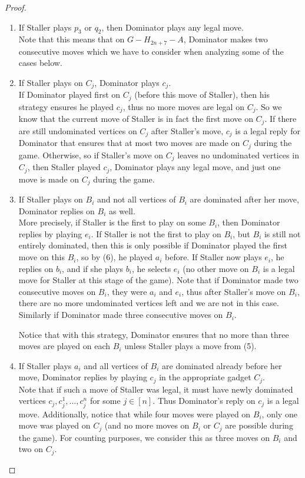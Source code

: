 \documentclass[12pt]{article}
\begin{document}
\begin{proof}
\begin{enumerate}[(1)]
		\item If Staller plays $p_3$ or $q_2$, then Dominator plays any legal move.\\
		Note that this means that on $G - H_{2n+7} -A$, Dominator makes two consecutive moves which we have to consider when analyzing some of the cases below.
		
		\item If Staller plays on $C_j$, Dominator plays $c_j$.\\
		If Dominator played first on $C_j$ (before this move of Staller), then his strategy ensures he played $c_j$, thus no more moves are legal on $C_j$. So we know that the current move of Staller is in fact the first move on $C_j$. If there are still undominated vertices on $C_j$ after Staller's move, $c_j$ is a legal reply for Dominator that ensures that at most two moves are made on $C_j$ during the game. Otherwise, so if Staller's move on $C_j$ leaves no undominated vertices in $C_j$, then Staller played $c_j$, Dominator plays any legal move, and just one move is made on $C_j$ during the game.
		
		\item If Staller plays on $B_i$ and not all vertices of $B_i$ are dominated after her move, Dominator replies on $B_i$ as well.\\
		More precisely, if Staller is the first to play on some $B_i$, then Dominator replies by playing $e_i$. If Staller is not the first to play on $B_i$, but $B_i$ is still not entirely dominated, then this is only possible if Dominator played the first move on this $B_i$, so by (6), he played $a_i$ before. If Staller now plays $e_i$, he replies on $b_i$, and if she plays $b_i$, he selects $e_i$ (no other move on $B_i$ is a legal move for Staller at this stage of the game). Note that if Dominator made two consecutive moves on $B_i$, they were $a_i$ and $e_i$, thus after Staller's move on $B_i$, there are no more undominated vertices left and we are not in this case. Similarly if Dominator made three consecutive moves on $B_i$.
		
		Notice that with this strategy, Dominator ensures that no more than three moves are played on each $B_i$ unless Staller plays a move from (5).
		
		\item If Staller plays $a_i$ and all vertices of $B_i$ are dominated already before her move, Dominator replies by playing $c_j$ in the appropriate gadget $C_j$.\\
		Note that if such a move of Staller was legal, it must have newly dominated vertices $c_j, c_j^1, \ldots, c_j^n$ for some $j \in [n]$. Thus Dominator's reply on $c_j$ is a legal move. Additionally, notice that while four moves were played on $B_i$, only one move was played on $C_j$ (and no more moves on $B_i$ or $C_j$ are possible during the game). For counting purposes, we consider this as three moves on $B_i$ and two on $C_j$.
		

\end{enumerate}
\end{proof}
\end{document}
